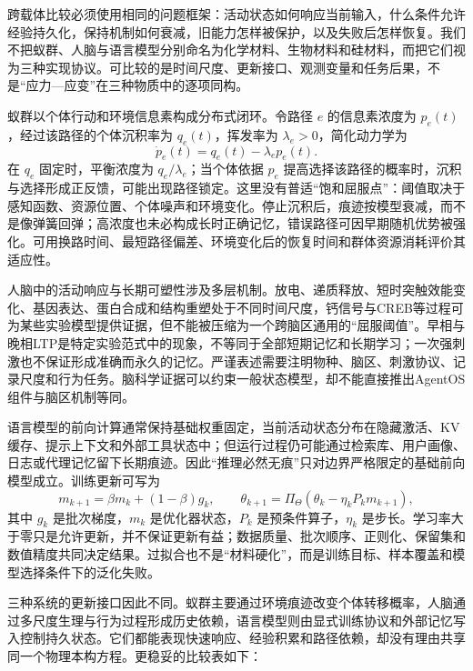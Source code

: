 跨载体比较必须使用相同的问题框架：活动状态如何响应当前输入，什么条件允许经验持久化，保持机制如何衰减，旧能力怎样被保护，以及失败后怎样恢复。我们不把蚁群、人脑与语言模型分别命名为化学材料、生物材料和硅材料，而把它们视为三种实现协议。可比较的是时间尺度、更新接口、观测变量和任务后果，不是“应力—应变”在三种物质中的逐项同构。

蚁群以个体行动和环境信息素构成分布式闭环。令路径 $e$ 的信息素浓度为 $p_e(t)$，经过该路径的个体沉积率为 $q_e(t)$，挥发率为 $\lambda_e>0$，简化动力学为
\[
\dot p_e(t)=q_e(t)-\lambda_e p_e(t).
\]
在 $q_e$ 固定时，平衡浓度为 $q_e/\lambda_e$；当个体依据 $p_e$ 提高选择该路径的概率时，沉积与选择形成正反馈，可能出现路径锁定。这里没有普适“饱和屈服点”：阈值取决于感知函数、资源位置、个体噪声和环境变化。停止沉积后，痕迹按模型衰减，而不是像弹簧回弹；高浓度也未必构成长时正确记忆，错误路径可因早期随机优势被强化。可用换路时间、最短路径偏差、环境变化后的恢复时间和群体资源消耗评价其适应性。

人脑中的活动响应与长期可塑性涉及多层机制。放电、递质释放、短时突触效能变化、基因表达、蛋白合成和结构重塑处于不同时间尺度，钙信号与CREB等过程可为某些实验模型提供证据，但不能被压缩为一个跨脑区通用的“屈服阈值”。早相与晚相LTP是特定实验范式中的现象，不等同于全部短期记忆和长期学习；一次强刺激也不保证形成准确而永久的记忆。严谨表述需要注明物种、脑区、刺激协议、记录尺度和行为任务。脑科学证据可以约束一般状态模型，却不能直接推出AgentOS组件与脑区机制等同。

语言模型的前向计算通常保持基础权重固定，当前活动状态分布在隐藏激活、KV缓存、提示上下文和外部工具状态中；但运行过程仍可能通过检索库、用户画像、日志或代理记忆留下长期痕迹。因此“推理必然无痕”只对边界严格限定的基础前向模型成立。训练更新可写为
\[
m_{k+1}=\beta m_k+(1-\beta)g_k,\qquad
\theta_{k+1}=\Pi_\Theta(\theta_k-\eta_k P_km_{k+1}),
\]
其中 $g_k$ 是批次梯度，$m_k$ 是优化器状态，$P_k$ 是预条件算子，$\eta_k$ 是步长。学习率大于零只是允许更新，并不保证更新有益；数据质量、批次顺序、正则化、保留集和数值精度共同决定结果。过拟合也不是“材料硬化”，而是训练目标、样本覆盖和模型选择条件下的泛化失败。

三种系统的更新接口因此不同。蚁群主要通过环境痕迹改变个体转移概率，人脑通过多尺度生理与行为过程形成历史依赖，语言模型则由显式训练协议和外部记忆写入控制持久状态。它们都能表现快速响应、经验积累和路径依赖，却没有理由共享同一个物理本构方程。更稳妥的比较表如下：

